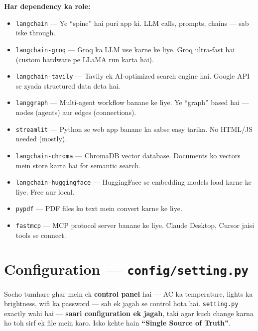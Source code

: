 \documentclass[12pt, a4paper]{article}
\begin{document}
\begin{codestorybox}
\textbf{Har dependency ka role:}
\begin{itemize}[leftmargin=*]
\item \texttt{langchain} --- Ye ``spine'' hai puri app ki. LLM calls, prompts, chains --- sab iske through.
\item \texttt{langchain-groq} --- Groq ka LLM use karne ke liye. Groq ultra-fast hai (custom hardware pe LLaMA run karta hai).
\item \texttt{langchain-tavily} --- Tavily ek AI-optimized search engine hai. Google API se zyada structured data deta hai.
\item \texttt{langgraph} --- Multi-agent workflow banane ke liye. Ye ``graph'' based hai --- nodes (agents) aur edges (connections).
\item \texttt{streamlit} --- Python se web app banane ka sabse easy tarika. No HTML/JS needed (mostly).
\item \texttt{langchain-chroma} --- ChromaDB vector database. Documents ko vectors mein store karta hai for semantic search.
\item \texttt{langchain-huggingface} --- HuggingFace se embedding models load karne ke liye. Free aur local.
\item \texttt{pypdf} --- PDF files ko text mein convert karne ke liye.
\item \texttt{fastmcp} --- MCP protocol server banane ke liye. Claude Desktop, Cursor jaisi tools se connect.
\end{itemize}
\end{codestorybox}


\newpage
\section{Configuration --- \texttt{config/setting.py}}

\begin{storybox}
Socho tumhare ghar mein ek \textbf{control panel} hai --- AC ka temperature, lights ka brightness, wifi ka password --- sab ek jagah se control hota hai. \texttt{setting.py} exactly wahi hai --- \textbf{saari configuration ek jagah}, taki agar kuch change karna ho toh sirf ek file mein karo. Isko kehte hain \textbf{``Single Source of Truth''}.
\end{storybox}
\end{document}
